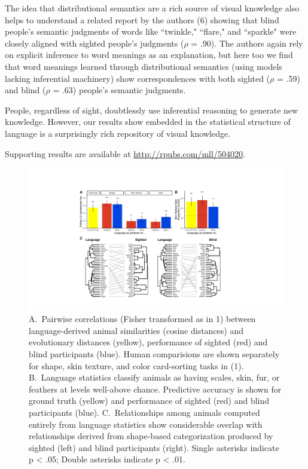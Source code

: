 \documentclass[12pt]{article}
\begin{document}
The idea that distributional semantics are a rich source of visual knowledge also helps to understand a related report by the authors (6) showing that blind people's semantic judgments of words like ``twinkle," ``flare," and ``sparkle" were closely aligned with sighted people’s judgments ($\rho$ = .90). The authors again rely on explicit inference to word meanings as an explanation, but here too we find that word meanings learned through distributional semantics (using models lacking inferential machinery) show correspondences with both sighted ($\rho$ = .59) and blind ($\rho$ = .63) people's semantic judgments. 

People, regardless of sight, doubtlessly use inferential reasoning to generate new knowledge. However, our results show embedded in the statistical structure of language is a surprisingly rich repository of visual knowledge.

Supporting results are available at \url{http://rpubs.com/mll/504020}.
\pagebreak

\begin{figure}[h!]
\centering
     \includegraphics[width=7in]{figure_ppt3.pdf}
      \caption{\footnotesize  A.\ Pairwise correlations (Fisher transformed as in 1) between language-derived animal similarities (cosine distances) and evolutionary distances (yellow), performance of sighted (red) and blind participants (blue). Human comparisions are shown separately for shape, skin texture, and color card-sorting tasks in (1). B.\ Language statistics classify animals as having scales, skin, fur, or feathers at levels well-above chance. Predictive accuracy is shown for ground truth (yellow) and performance of sighted (red) and blind participants (blue).  C.\ Relationships among animals computed entirely from language statistics show considerable overlap with relationships derived from shape-based categorization produced by sighted (left) and blind participants (right). Single asterisks indicate p < .05; Double asterisks indicate p < .01. }
\end{figure}
\end{document}
